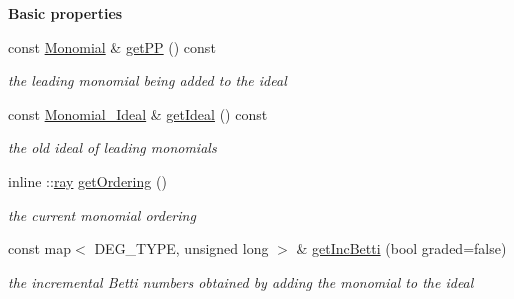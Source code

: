 \begin{Indent}\textbf{ Basic properties}\par
\begin{DoxyCompactItemize}
\item 
\mbox{\label{group___g_b_computation_a89093fdbc58161c646f61b54b0cd3ed5}} 
const \hyperlink{group__polygroup_class_monomial}{Monomial} \& \hyperlink{group___g_b_computation_a89093fdbc58161c646f61b54b0cd3ed5}{get\+PP} () const
\begin{DoxyCompactList}\small\item\em the leading monomial being added to the ideal \end{DoxyCompactList}\item 
\mbox{\label{group___g_b_computation_ad83d8400ef6e5c9fc5e100b304063500}} 
const \hyperlink{group__polygroup_class_monomial___ideal}{Monomial\+\_\+\+Ideal} \& \hyperlink{group___g_b_computation_ad83d8400ef6e5c9fc5e100b304063500}{get\+Ideal} () const
\begin{DoxyCompactList}\small\item\em the old ideal of leading monomials \end{DoxyCompactList}\item 
\mbox{\label{group___g_b_computation_a11af0cf4088749e2edf36ddd98ec5dc0}} 
inline \+::\hyperlink{group___c_l_s_solvers_classray}{ray} \hyperlink{group___g_b_computation_a11af0cf4088749e2edf36ddd98ec5dc0}{get\+Ordering} ()
\begin{DoxyCompactList}\small\item\em the current monomial ordering \end{DoxyCompactList}\item 
\mbox{\label{group___g_b_computation_a23e90cb6ef17369bfae7e2932f484c4f}} 
const map$<$ D\+E\+G\+\_\+\+T\+Y\+PE, unsigned long $>$ \& \hyperlink{group___g_b_computation_a23e90cb6ef17369bfae7e2932f484c4f}{get\+Inc\+Betti} (bool graded=false)
\begin{DoxyCompactList}\small\item\em the incremental Betti numbers obtained by adding the monomial to the ideal \end{DoxyCompactList}\item 
\mbox{\label{group___g_b_computation_a26a40483e6f79118a5433ef255f77bb1}} 

\end{DoxyCompactItemize}
\end{Indent}
